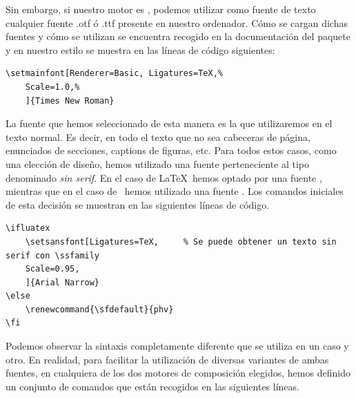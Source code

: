 Sin embargo, si nuestro motor es \LuaLaTeX, podemos utilizar como fuente de texto cualquier fuente .otf ó .ttf presente en nuestro ordenador. Cómo se cargan dichas fuentes y cómo se utilizan se encuentra recogido en la documentación del paquete  y en nuestro estilo se muestra en las líneas de código siguientes:
\begin{lstlisting}[rulecolor=\color{white}]
\setmainfont[Renderer=Basic, Ligatures=TeX,% 
	Scale=1.0,%
	]{Times New Roman}
\end{lstlisting}

La fuente que hemos seleccionado de esta manera es la que utilizaremos en el texto normal. Es decir, en todo el texto que no sea cabeceras de página, enunciados de secciones, captions de figuras, etc. Para todos estos casos, como una elección de diseño, hemos utilizado una fuente perteneciente al tipo denominado \emph{sin serif}. En el caso de \LaTeX\ hemos optado por una fuente {\fi}, mientras que en el caso de \LuaLaTeX\ hemos utilizado una fuente {\fi}. Los comandos iniciales de esta decisión se muestran en las siguientes líneas de código.
\begin{lstlisting}[rulecolor=\color{white}]
\ifluatex
	\setsansfont[Ligatures=TeX,		% Se puede obtener un texto sin serif con \ssfamily				
	Scale=0.95,
	]{Arial Narrow}
\else
	\renewcommand{\sfdefault}{phv} 
\fi
\end{lstlisting}

Podemos observar la sintaxis completamente diferente que se utiliza en un caso y otro.  En realidad, para facilitar la utilización de diversas variantes de ambas fuentes, en cualquiera de los dos motores de composición elegidos, hemos definido un conjunto de comandos que están recogidos en las siguientes líneas.

